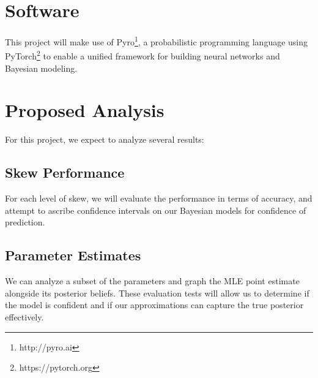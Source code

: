 \documentclass{article}
\begin{document}
\section{Software}
This project will make use of Pyro\footnote{http://pyro.ai}, a
probabilistic programming language using PyTorch\footnote{https://pytorch.org}
to enable a unified framework for building neural networks and Bayesian modeling.

\section{Proposed Analysis}
For this project, we expect to analyze several results:
\subsection{Skew Performance}
For each level of skew, we will evaluate the performance in terms of accuracy,
and attempt to ascribe confidence intervals on our Bayesian models for confidence
of prediction.
\subsection{Parameter Estimates}
We can analyze a subset of the parameters and graph the MLE point estimate alongside
its posterior beliefs. These evaluation tests will allow us to determine if the
model is confident and if our approximations can capture the true posterior
effectively.





\end{document}
